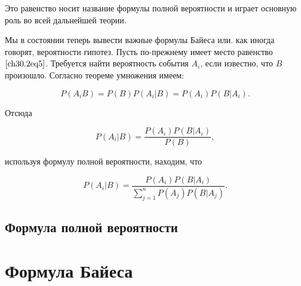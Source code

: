 Это равенство носит название формулы полной вероятности и играет основную роль во всей дальнейшей теории.

Мы в состоянии теперь вывести важные формулы Байеса или. как иногда говорят, вероятности гипотез. Пусть по-прежнему имеет место равенство $\eqref{ch30.2eq5}$. Требуется найти вероятность события $A_i$, если известно, что $B$ произошло. Согласно теореме умножения имеем:

$$
P(A_i B) = P(B)P(A_i|B) = P(A_i)P(B|A_i).
$$

Отсюда

$$
P(A_i|B) = \frac{P(A_i)P(B|A_i)}{P(B)},
$$

используя формулу полной вероятности, находим, что

$$
P(A_i|B) = \frac{P(A_i)P(B|A_i)}{\sum\limits_{j = 1}^{n} P(A_j)P(B|A_j)}.
$$

\subsection{Формула полной вероятности}
\section{Формула Байеса}
